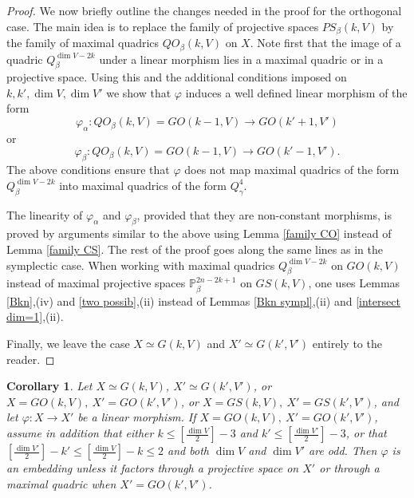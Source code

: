 \documentclass[12pt]{amsart}
\renewcommand{\phi}{\varphi}
\newtheorem{corollary}[theorem]{Corollary}
\theoremstyle{definition}
\begin{document}
\begin{proof}
\vspace{2mm}
We now briefly outline the changes needed in the proof for the orthogonal case. The main idea is to replace the family
of projective spaces $PS_{\beta}(k,V)$ by the family of maximal quadrics $QO_{\beta}(k,V)$ on $X$. Note first that the
image of a quadric $Q^{\dim V-2k}_{\beta}$ under a linear morphism lies in a maximal quadric or in a projective space.
Using this and the additional conditions imposed on $k,k',\dim V,\dim V'$
we show that $\phi$ induces a well defined linear morphism of the form
\begin{equation}\label{phi a}
\phi_{\alpha}: QO_{\beta}(k,V)=GO(k-1,V)\to GO(k'+1,V')
\end{equation}
or
\begin{equation}\label{phi b}
\phi_{\beta}: QO_{\beta}(k,V)=GO(k-1,V)\to GO(k'-1,V').
\end{equation}
The above conditions ensure that $\phi$ does not map maximal quadrics of the form $Q^{\dim V-2k}_{\beta}$ into maximal
quadrics of the form $Q^4_{\gamma}$.

The linearity of $\phi_{\alpha}$ and $\phi_{\beta}$, provided that they are
non-constant morphisms, is proved by arguments similar to the above using Lemma \ref{family CO} instead of Lemma
\ref{family CS}.
The rest of the proof goes along the same lines as in the symplectic case. When working with maximal quadrics
$Q^{\dim V-2k}_{\beta}$ on $GO(k,V)$ instead of maximal projective spaces $\mathbb{P}^{2n-2k+1}_{\beta}$ on $GS(k,V)$,
one uses Lemmas \ref{Bkn},(iv) and \ref{two possib},(ii) instead of Lemmas \ref{Bkn sympl},(ii) and
\ref{intersect dim=1},(ii).

\vspace{2mm}
Finally, we leave the case $X\simeq G(k,V)$ and $X'\simeq G(k',V')$ entirely to the reader.
\end{proof}

\begin{corollary}\label{new 3.8}
\textit{Let $X\simeq G(k,V)$, $X'\simeq G(k',V')$, or $X=GO(k,V),\ X'=GO(k',V')$, or
$X=GS(k,V),\ X'=GS(k',V')$, and let $\phi: X \to X'$ be a linear morphism.
If $X=GO(k,V),\ X'=GO(k',V')$, assume in addition that either $k\le[\frac{\dim V}{2}]-3$ and
$k'\le[\frac{\dim V'}{2}]-3$, or that $[\frac{\dim V'}{2}]-k'\le[\frac{\dim V}{2}]-k\le2$ and both $\dim V$ and
$\dim V'$ are odd. Then $\phi$ is an embedding unless it factors through a projective space on $X'$
or through a maximal quadric when $X'=GO(k',V')$.}
\end{corollary}
\end{document}
